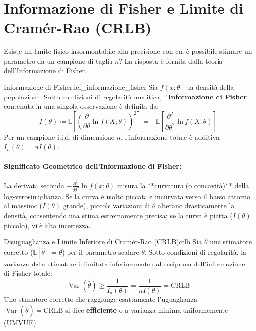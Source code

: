 \section{Informazione di Fisher e Limite di Cramér-Rao (CRLB)}
\label{sec:fisher_cramer_rao}

Esiste un limite fisico insormontabile alla precisione con cui è possibile stimare un parametro da un campione di taglia $n$? La risposta è fornita dalla teoria dell'Informazione di Fisher.

\begin{definizione}{Informazione di Fisher}{def_informazione_fisher}
Sia $f(x; \theta)$ la densità della popolazione. Sotto condizioni di regolarità analitica, l'\textbf{Informazione di Fisher} contenuta in una singola osservazione è definita da:
\begin{equation}
    I(\theta) \coloneqq \mathbb{E}\left[ \left( \frac{\partial}{\partial \theta} \ln f(X; \theta) \right)^2 \right] = -\mathbb{E}\left[ \frac{\partial^2}{\partial \theta^2} \ln f(X; \theta) \right]
\end{equation}
Per un campione i.i.d. di dimensione $n$, l'informazione totale è additiva: $I_n(\theta) = n I(\theta)$.
\end{definizione}

\paragraph{Significato Geometrico dell'Informazione di Fisher:}
La derivata seconda $-\frac{\partial^2}{\partial \theta^2} \ln f(x; \theta)$ misura la **curvatura (o concavità)** della log-verosimiglianza. Se la curva è molto piccata e incurvata verso il basso attorno al massimo ($I(\theta)$ grande), piccole variazioni di $\theta$ alterano drasticamente la densità, consentendo una stima estremamente precisa; se la curva è piatta ($I(\theta)$ piccolo), vi è alta incertezza.

\begin{teorema}{Disuguaglianza e Limite Inferiore di Cramér-Rao (CRLB)}{crlb}
Sia $\widehat{\theta}$ uno stimatore corretto ($\mathbb{E}[\widehat{\theta}] = \theta$) per il parametro scalare $\theta$. Sotto condizioni di regolarità, la varianza dello stimatore è limitata inferiormente dal reciproco dell'informazione di Fisher totale:
\begin{equation}
    \operatorname{Var}(\widehat{\theta}) \ge \frac{1}{I_n(\theta)} = \frac{1}{n I(\theta)} = \text{CRLB}
\end{equation}
Uno stimatore corretto che raggiunge esattamente l'uguaglianza $\operatorname{Var}(\widehat{\theta}) = \text{CRLB}$ si dice \textbf{efficiente} o a varianza minima uniformemente (UMVUE).
\end{teorema}

